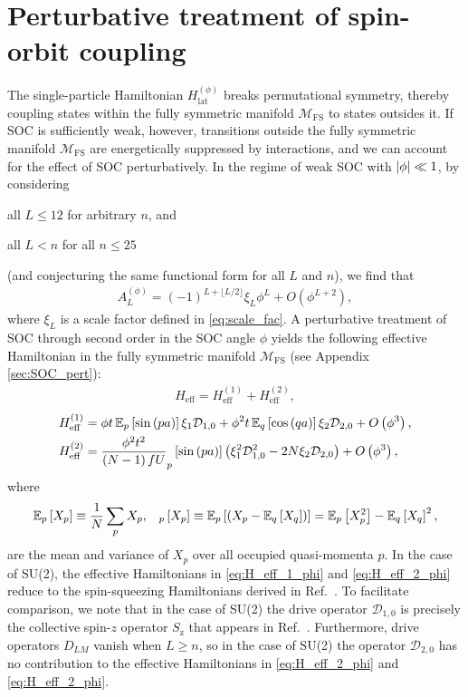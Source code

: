 \documentclass[nofootinbib,notitlepage,11pt]{revtex4-2}
\renewcommand{\t}{\text} %
\newcommand{\f}[2]{\dfrac{#1}{#2}} %
\newcommand{\p}[1]{\left(#1\right)} %
\renewcommand{\sp}[1]{\left[#1\right]} %
\newcommand{\1}{\mathds{1}}
\newcommand{\z}{\text{z}}
\newcommand{\D}{\mathcal{D}}
\newcommand{\M}{\mathcal{M}}
\newcommand{\EE}{\mathbb{E}}
\newcommand{\FS}{\text{FS}}
\let\var\relax
\DeclareMathOperator{\var}{var}
\begin{document}
\section{Perturbative treatment of spin-orbit coupling}
\label{sec:pert_SOC}

The single-particle Hamiltonian $H_{\t{lat}}^{(\phi)}$ breaks
permutational symmetry, thereby coupling states within the fully
symmetric manifold $\M_\FS$ to states outsides it.  If SOC is
sufficiently weak, however, transitions outside the fully symmetric
manifold $\M_\FS$ are energetically suppressed by interactions, and we
can account for the effect of SOC perturbatively.  In the regime of
weak SOC with $\abs{\phi}\ll1$, by considering
\begin{enumerate*}
\item all $L\le12$ for arbitrary $n$, and
\item all $L<n$ for all $n\le25$
\end{enumerate*}
(and conjecturing the same functional form for all $L$ and $n$), we
find that
\begin{align}
  A_L^{(\phi)}
  = \p{-1}^{L+\lfloor L/2\rfloor} \xi_L \phi^L + O\p{\phi^{L+2}},
  \label{eq:A_L_phi_small}
\end{align}
where $\xi_L$ is a scale factor defined in \eqref{eq:scale_fac}.  A
perturbative treatment of SOC through second order in the SOC angle
$\phi$ yields the following effective Hamiltonian in the fully
symmetric manifold $\M_\FS$ (see Appendix \ref{sec:SOC_pert}):
\begin{align}
  H_{\t{eff}} = H_{\t{eff}}^{(1)} + H_{\t{eff}}^{(2)},
\end{align}
\begin{align}
  H_{\t{eff}}^{(1)}
  &= \phi t \, \EE_p\sp{\sin\p{pa}} \xi_1 \D_{1,0}
  + \phi^2 t \, \EE_q\sp{\cos\p{qa}} \xi_2 \D_{2,0}
  + O\p{\phi^3},
  \label{eq:H_eff_1_phi} \\
  H_{\t{eff}}^{(2)}
  &= \f{\phi^2 t^2}{\p{N-1}fU} \var_p\sp{\sin\p{pa}}
  \p{\xi_1^2 \D_{1,0}^2 - 2 N \xi_2 \D_{2,0}}
  + O\p{\phi^3},
  \label{eq:H_eff_2_phi}
\end{align}
where
\begin{align}
  \EE_p\sp{X_p} \equiv \f1N \sum_p X_p,
  &&
  \var_p\sp{X_p} \equiv \EE_p\sp{\p{X_p-\EE_q\sp{X_q}}}
  = \EE_p\sp{X_p^2}-\EE_q\sp{X_q}^2,
\end{align}
are the mean and variance of $X_p$ over all occupied quasi-momenta
$p$.  In the case of SU(2), the effective Hamiltonians in
\eqref{eq:H_eff_1_phi} and \eqref{eq:H_eff_2_phi} reduce to the
spin-squeezing Hamiltonians derived in Ref.~\cite{he2019engineering}.
To facilitate comparison, we note that in the case of SU(2) the drive
operator $\D_{1,0}$ is precisely the collective spin-$z$ operator
$S_\z$ that appears in Ref.~\cite{he2019engineering}.  Furthermore,
drive operators $D_{LM}$ vanish when $L\ge n$, so in the case of SU(2)
the operator $\D_{2,0}$ has no contribution to the effective
Hamiltonians in \eqref{eq:H_eff_2_phi} and \eqref{eq:H_eff_2_phi}.
\end{document}
